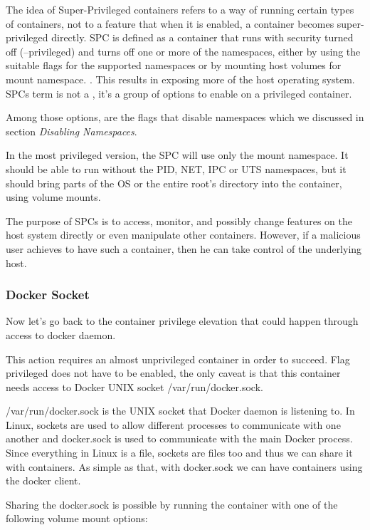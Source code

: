 \begin{description}[style=nextline]
The idea of Super-Privileged containers refers to a way of running certain types of containers, not to a feature that when it is enabled, a container becomes super-privileged directly. SPC is defined as a container that runs with security turned off (--privileged) and turns off one or more of the namespaces, either by using the suitable flags for the supported namespaces or by mounting host volumes for mount namespace. \cite{spcbydanwalsh}. This results in exposing more of the host operating system.
SPCs term is not a , it's a group of options to enable on a privileged container. 

Among those options, are the flags that disable namespaces which we discussed in section \textit{Disabling Namespaces}.

In the most privileged version, the SPC will use only the mount namespace. It should be able to run without the PID, NET, IPC or UTS namespaces, but it should bring parts of the OS or the entire root's directory into the container, using volume mounts.

The purpose of SPCs is to access, monitor, and possibly change features on the host system directly or even manipulate other containers. However, if a malicious user achieves to have such a container, then he can take control of the underlying host.
\end{description}

\subsubsection{Docker Socket}
Now let's go back to the container privilege elevation that could happen through access to docker daemon.

This action requires an almost unprivileged container in order to succeed. Flag privileged does not have to be enabled, the only caveat is that this container needs access to Docker UNIX socket /var/run/docker.sock.

/var/run/docker.sock is the UNIX socket that Docker daemon is listening to. In Linux, sockets are used to allow different processes to communicate with one another and docker.sock is used to communicate with the main Docker process. Since everything in Linux is a file, sockets are files too and thus we can share it with containers. As simple as that, with docker.sock we can have containers using the docker client.

Sharing the docker.sock is possible by running the container with one of the following volume mount options:

